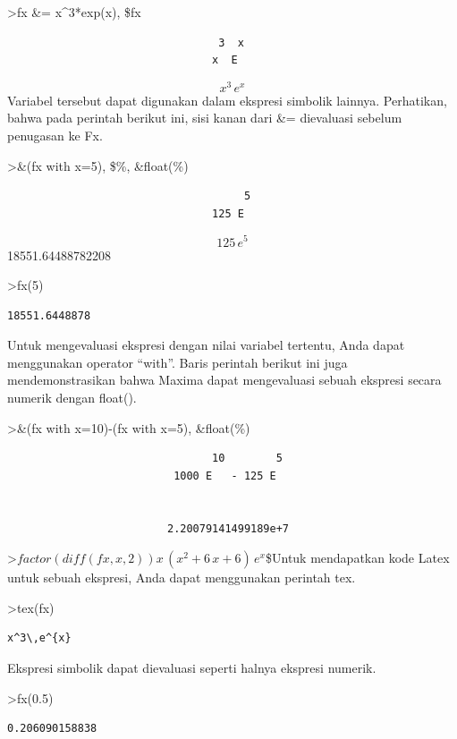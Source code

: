 \documentclass[
]{book}
\begin{document}
\textgreater fx \&= x\^{}3*exp(x), \$fx

\begin{verbatim}
                                 3  x
                                x  E
\end{verbatim}

\[x^3\,e^{x}\]Variabel tersebut dapat digunakan dalam ekspresi simbolik lainnya. Perhatikan, bahwa pada perintah berikut ini, sisi kanan dari \&= dievaluasi sebelum penugasan ke Fx.

\textgreater\&(fx with x=5), \$\%, \&float(\%)

\begin{verbatim}
                                     5
                                125 E
\end{verbatim}

\[125\,e^5\] 18551.64488782208

\textgreater fx(5)

\begin{verbatim}
18551.6448878
\end{verbatim}

Untuk mengevaluasi ekspresi dengan nilai variabel tertentu, Anda dapat menggunakan operator ``with''. Baris perintah berikut ini juga mendemonstrasikan bahwa Maxima dapat mengevaluasi sebuah ekspresi secara numerik dengan float().

\textgreater\&(fx with x=10)-(fx with x=5), \&float(\%)

\begin{verbatim}
                                10        5
                          1000 E   - 125 E


                         2.20079141499189e+7
\end{verbatim}

\textgreater{}\(factor(diff(fx,x,2))\)\(x\,\left(x^2+6\,x+6\right)\,e^{x}\)\$Untuk mendapatkan kode Latex untuk sebuah ekspresi, Anda dapat menggunakan perintah tex.

\textgreater tex(fx)

\begin{verbatim}
x^3\,e^{x}
\end{verbatim}

Ekspresi simbolik dapat dievaluasi seperti halnya ekspresi numerik.

\textgreater fx(0.5)

\begin{verbatim}
0.206090158838
\end{verbatim}
\end{document}
